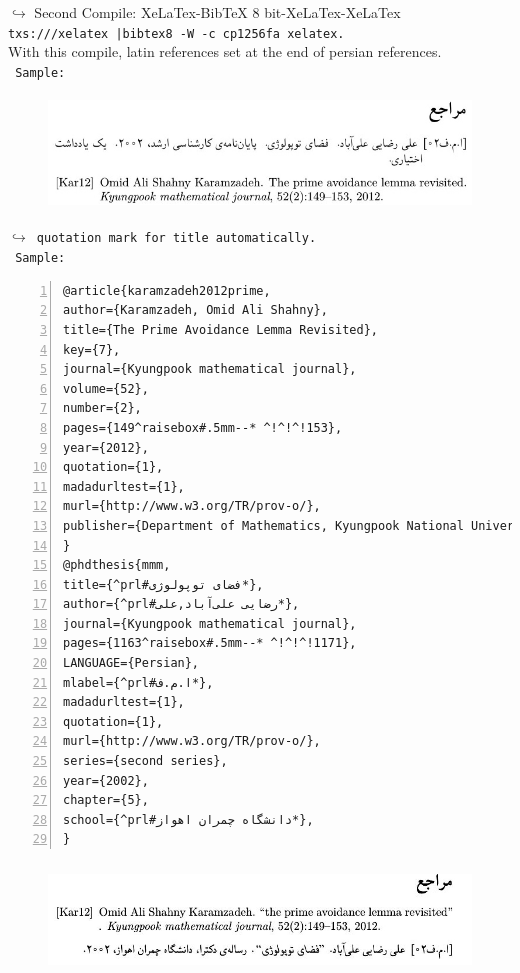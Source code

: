 \documentclass{article}
\begin{document}
\begin{latin}\noindent
{\color{red}$\hookrightarrow$ Second Compile:} XeLaTex-BibTeX 8 bit-XeLaTex-XeLaTex\\
{\tt txs:///xelatex |bibtex8 -W -c cp1256fa %
xelatex.}\\
With this compile, latin references set at the end of  persian references.\\
{\tt\color{blue} Sample:}
\end{latin}	
\begin{figure}[H]
\centering
\includegraphics[width=\textwidth,height=3cm]{image/sht}
\end{figure}
\begin{latin}\noindent
{\tt {\color{red}$\hookrightarrow$ quotation mark for title automatically.}}\\
{\tt\color{blue} Sample:}
\end{latin}
\begin{Verbatim}[numbers=left,fontsize=\bf,commandchars=\^\#\*,baselinestretch=1,firstnumber=1,formatcom=\color{green!50!black}]
@article{karamzadeh2012prime,
author={Karamzadeh, Omid Ali Shahny},
title={The Prime Avoidance Lemma Revisited},
key={7},
journal={Kyungpook mathematical journal},
volume={52},
number={2},
pages={149^raisebox#.5mm--* ^!^!^!153},
year={2012},
quotation={1},
madadurltest={1},
murl={http://www.w3.org/TR/prov-o/},
publisher={Department of Mathematics, Kyungpook National University}
}
@phdthesis{mmm,
title={^prl#فضای توپولوژی*},
author={^prl#رضایی علی‌آباد,علی*},
journal={Kyungpook mathematical journal},
pages={1163^raisebox#.5mm--* ^!^!^!1171},
LANGUAGE={Persian},
mlabel={^prl#ا.م.ف*},
madadurltest={1},
quotation={1},
murl={http://www.w3.org/TR/prov-o/},
series={second series},
year={2002},
chapter={5},
school={^prl#دانشگاه چمران اهواز*},
}
\end{Verbatim}
\begin{figure}[H]
\centering
\includegraphics[width=\textwidth,height=3cm]{image/sh2}
\end{figure}
\end{document}
